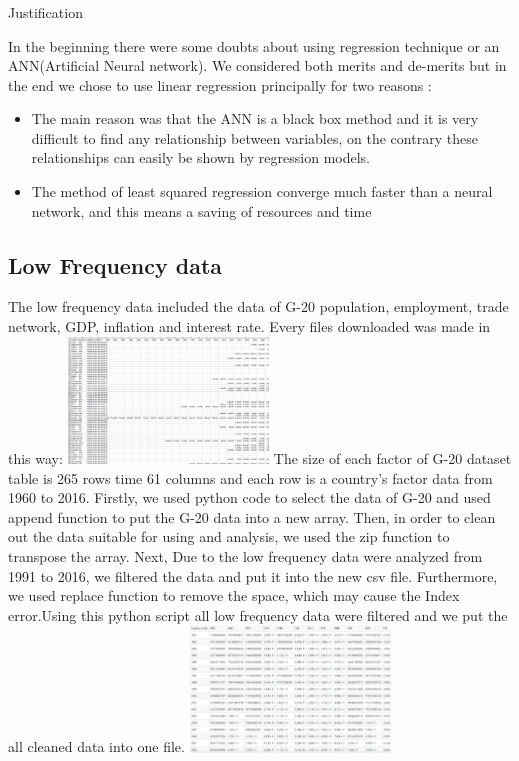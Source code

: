 \subsubsection{}{Justification}

In the beginning there were some doubts about using regression technique or an ANN(Artificial Neural network)\cite{leung2000forecasting}.
We considered both merits and de-merits but in the end we chose to use linear regression principally for two reasons : 
\begin{itemize}
\item The main reason was that the ANN is a black box method and it is very difficult to find any relationship between variables, on the contrary these relationships can easily be shown by regression models. 
\item The method of least squared regression converge much faster than a neural network, and this means a saving of resources and time 
\end{itemize}

\subsection{Low Frequency data}
The low frequency data included the data of G-20 population, employment, trade network, GDP, inflation and interest rate. Every files downloaded was made in this way: 
\newline
\includegraphics[width=0.40\textwidth]{all_data.png}
\newline
The size of each factor of G-20 dataset table is 265 rows time 61 columns and each row is a country's factor data  from 1960 to 2016.
Firstly, we used python code to select the data of G-20 and used append function to put the G-20 data into a new array.
Then,  in order to clean out the data suitable for using and analysis, we used the zip function to transpose the array.
Next, Due to the low frequency data were analyzed from 1991 to 2016, we filtered the data and put it into the new csv file.
Furthermore, we used replace function to remove the space, which may cause the Index error.Using this python script all low frequency data were filtered and we put the all cleaned data into one file.
\newline
\includegraphics[width=0.40\textwidth]{Capture.JPG}
\newline
